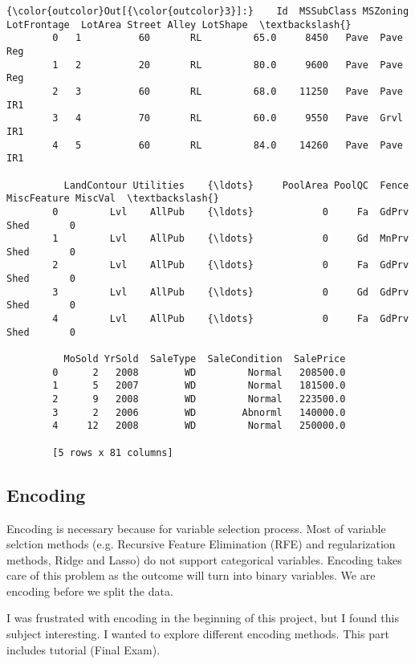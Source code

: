 \documentclass[11pt]{article}
\begin{document}
\begin{Verbatim}[commandchars=\\\{\}]
{\color{outcolor}Out[{\color{outcolor}3}]:}    Id  MSSubClass MSZoning  LotFrontage  LotArea Street Alley LotShape  \textbackslash{}
        0   1          60       RL         65.0     8450   Pave  Pave      Reg   
        1   2          20       RL         80.0     9600   Pave  Pave      Reg   
        2   3          60       RL         68.0    11250   Pave  Pave      IR1   
        3   4          70       RL         60.0     9550   Pave  Grvl      IR1   
        4   5          60       RL         84.0    14260   Pave  Pave      IR1   
        
          LandContour Utilities    {\ldots}     PoolArea PoolQC  Fence MiscFeature MiscVal  \textbackslash{}
        0         Lvl    AllPub    {\ldots}            0     Fa  GdPrv        Shed       0   
        1         Lvl    AllPub    {\ldots}            0     Gd  MnPrv        Shed       0   
        2         Lvl    AllPub    {\ldots}            0     Fa  GdPrv        Shed       0   
        3         Lvl    AllPub    {\ldots}            0     Gd  GdPrv        Shed       0   
        4         Lvl    AllPub    {\ldots}            0     Fa  GdPrv        Shed       0   
        
          MoSold YrSold  SaleType  SaleCondition  SalePrice  
        0      2   2008        WD         Normal   208500.0  
        1      5   2007        WD         Normal   181500.0  
        2      9   2008        WD         Normal   223500.0  
        3      2   2006        WD        Abnorml   140000.0  
        4     12   2008        WD         Normal   250000.0  
        
        [5 rows x 81 columns]
\end{Verbatim}
            
    \subsection{Encoding}\label{encoding}

Encoding is necessary because for variable selection process. Most of
variable selction methods (e.g. Recursive Feature Elimination (RFE) and
regularization methods, Ridge and Lasso) do not support categorical
variables. Encoding takes care of this problem as the outcome will turn
into binary variables. We are encoding before we split the data.

I was frustrated with encoding in the beginning of this project, but I
found this subject interesting. I wanted to explore different encoding
methods. This part includes tutorial (Final Exam).
\end{document}
